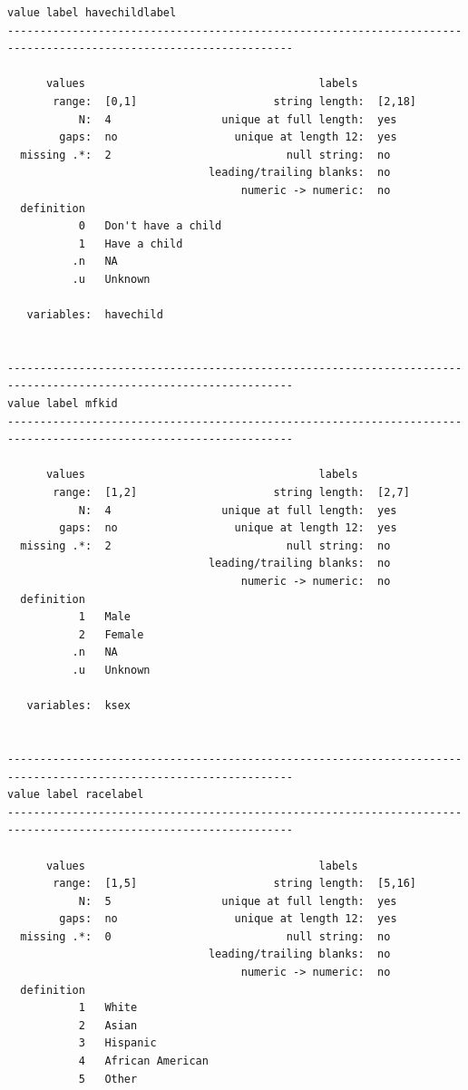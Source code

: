 \documentclass[
]{book}
\begin{document}
\begin{verbatim}
value label havechildlabel 
------------------------------------------------------------------------------------------------------------------

      values                                    labels
       range:  [0,1]                     string length:  [2,18]
           N:  4                 unique at full length:  yes
        gaps:  no                  unique at length 12:  yes
  missing .*:  2                           null string:  no
                               leading/trailing blanks:  no
                                    numeric -> numeric:  no
  definition
           0   Don't have a child
           1   Have a child
          .n   NA
          .u   Unknown

   variables:  havechild


------------------------------------------------------------------------------------------------------------------
value label mfkid 
------------------------------------------------------------------------------------------------------------------

      values                                    labels
       range:  [1,2]                     string length:  [2,7]
           N:  4                 unique at full length:  yes
        gaps:  no                  unique at length 12:  yes
  missing .*:  2                           null string:  no
                               leading/trailing blanks:  no
                                    numeric -> numeric:  no
  definition
           1   Male
           2   Female
          .n   NA
          .u   Unknown

   variables:  ksex


------------------------------------------------------------------------------------------------------------------
value label racelabel 
------------------------------------------------------------------------------------------------------------------

      values                                    labels
       range:  [1,5]                     string length:  [5,16]
           N:  5                 unique at full length:  yes
        gaps:  no                  unique at length 12:  yes
  missing .*:  0                           null string:  no
                               leading/trailing blanks:  no
                                    numeric -> numeric:  no
  definition
           1   White
           2   Asian
           3   Hispanic
           4   African American
           5   Other


\end{verbatim}
\end{document}
